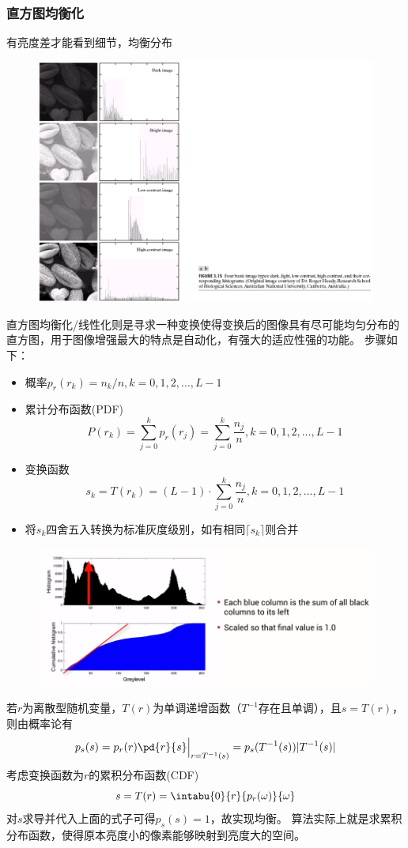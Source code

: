 \subsubsection{直方图均衡化}
有亮度差才能看到细节，均衡分布
\begin{figure}[H]
\centering
\includegraphics[width=0.6\linewidth]{fig/histogram-quality.png}
\end{figure}

直方图均衡化/线性化则是寻求一种变换使得变换后的图像具有尽可能均匀分布的直方图，用于图像增强最大的特点是自动化，有强大的适应性强的功能。
步骤如下：
\begin{itemize}
	\item 概率$p_r(r_k)=n_k/n,k=0,1,2,\ldots,L-1$
	\item 累计分布函数(PDF)
	\[P(r_k)=\sum_{j=0}^k p_r(r_j)=\sum_{j=0}^k\frac{n_j}{n},k=0,1,2,\ldots,L-1\]
	\item 变换函数
	\[s_k=T(r_k)=(L-1)\cdot\sum_{j=0}^k\frac{n_j}{n},k=0,1,2,\ldots,L-1\]
	\item 将$s_k$四舍五入转换为标准灰度级别，如有相同$\lceil s_k\rceil$则合并
\end{itemize}
\begin{figure}[H]
\centering
\includegraphics[width=0.8\linewidth]{fig/histogram-normalization.png}
\end{figure}
\begin{analysis}
若$r$为离散型随机变量，$T(r)$为单调递增函数（$T^{-1}$存在且单调），且$s=T(r)$，则由概率论有
\[p_s(s)=p_r(r)\pd{r}{s}\Big|_{r=T^{-1}(s)}=p_s(T^{-1}(s))|T^{-1}(s)|\]
考虑变换函数为$r$的累积分布函数(CDF)
\[s=T(r)=\intabu{0}{r}{p_r(\omega)}{\omega}\]
对$s$求导并代入上面的式子可得$p_s(s)=1$，故实现均衡。
算法实际上就是求累积分布函数，使得原本亮度小的像素能够映射到亮度大的空间。
\end{analysis}

